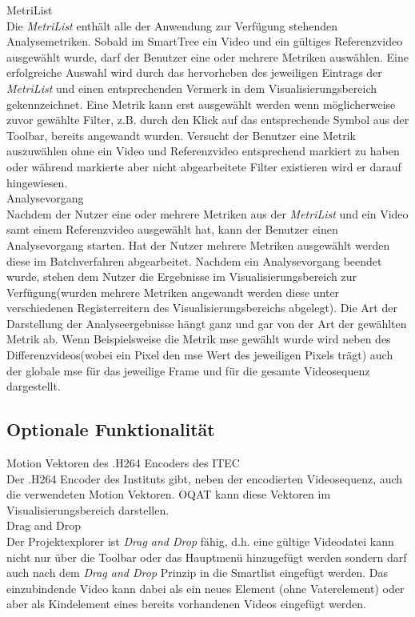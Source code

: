 %
 MetriList\\
Die \emph{MetriList} enthält alle der Anwendung zur Verfügung stehenden Analysemetriken.
Sobald im SmartTree ein Video und ein gültiges Referenzvideo ausgewählt wurde, darf der Benutzer
eine oder mehrere Metriken auswählen. Eine erfolgreiche Auswahl wird durch das hervorheben des
jeweiligen Eintrags der \emph{MetriList} und einen entsprechenden Vermerk in dem Visualisierungsbereich
gekennzeichnet. Eine Metrik kann erst ausgewählt werden wenn möglicherweise zuvor gewählte Filter,
z.B. durch den Klick auf das entsprechende Symbol aus der Toolbar, bereits angewandt wurden. Versucht
der Benutzer eine Metrik auszuwählen ohne ein Video und Referenzvideo entsprechend markiert zu haben oder
während markierte aber nicht abgearbeitete Filter existieren wird er darauf hingewiesen.\\
 Analysevorgang \\
Nachdem der Nutzer eine oder mehrere Metriken aus der \emph{MetriList} und ein
Video samt einem Referenzvideo ausgewählt hat, kann der Benutzer einen Analysevorgang starten. Hat der
Nutzer mehrere Metriken ausgewählt werden diese im Batchverfahren abgearbeitet. Nachdem ein Analysevorgang
beendet wurde, stehen dem Nutzer die Ergebnisse im Visualisierungsbereich zur Verfügung(wurden 
mehrere Metriken angewandt werden diese unter verschiedenen Registerreitern des Visualisierungsbereichs
abgelegt). Die Art der Darstellung der Analyseergebnisse hängt ganz und gar von der Art der gewählten 
Metrik ab. Wenn Beispielsweise die Metrik \gls{mse} gewählt wurde wird neben des Differenzvideos(wobei ein
Pixel den \gls{mse} Wert des jeweiligen Pixels trägt) auch der globale \gls{mse} für das jeweilige Frame
und für die gesamte Videosequenz dargestellt.

\subsection{Optionale Funktionalität}
\setcounter{counterKriterien}{0}
 Motion Vektoren des .H264 Encoders des \gls{ITEC}\\
Der .H264 Encoder des Instituts gibt, neben der encodierten Videosequenz, auch die verwendeten Motion
Vektoren. \gls{OQAT} kann diese Vektoren im Visualisierungsbereich darstellen.\\
 Drag and Drop\\
Der Projektexplorer ist \emph{Drag and Drop} fähig, d.h. eine gültige Videodatei kann nicht nur über
die Toolbar oder das Hauptmenü hinzugefügt werden sondern darf auch nach dem \emph{Drag and Drop} Prinzip
in die Smartlist eingefügt werden. Das einzubindende Video kann dabei als ein neues Element (ohne
Vaterelement) oder aber als Kindelement eines bereits vorhandenen Videos eingefügt werden.
